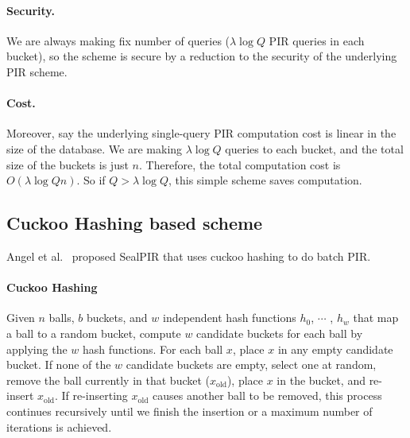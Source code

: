 \paragraph{Security.}
We are always making fix number of queries ($\lambda \log Q$ PIR queries in each bucket), so the scheme is secure by a reduction to the security of the underlying PIR scheme.

\paragraph{Cost.}
Moreover, say the underlying single-query PIR computation cost is linear in the size of the database.
We are making $\lambda \log Q$ queries to each bucket, and the total size of the buckets is just $n$. 
Therefore, the total computation cost is $O(\lambda \log Q n)$. 
So if $Q>\lambda \log Q$, this simple scheme saves computation.


     
     
\subsection{Cuckoo Hashing based scheme~\cite{angel2018pir}}

Angel et al.~\cite{angel2018pir} proposed SealPIR that uses cuckoo hashing to do batch PIR.
    
    \paragraph{Cuckoo Hashing}
    \begin{definition}
        Given $n$ balls, $b$ buckets, and $w$
independent hash functions $h_0$, $\cdots$ , $h_{w}$ that map a ball to a
random bucket, compute $w$ candidate buckets for each ball by
applying the $w$ hash functions. For each ball $x$, place $x$ in any
empty candidate bucket. If none of the $w$ candidate buckets
are empty, select one at random, remove the ball currently in
that bucket ($x_{\text{old}}$), place $x$ in the bucket, and re-insert $x_{\text{old}}$. If
re-inserting $x_{\text{old}}$ causes another ball to be removed, this process
continues recursively until we finish the insertion or a maximum number of iterations is achieved.
    \end{definition} \
    
